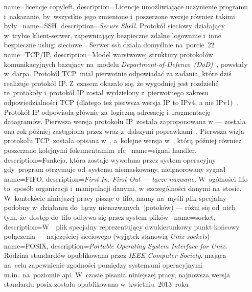 {
	name={licencje copyleft},
	description={Licencje umożliwiające uczynienie programu  i~nakazanie, by~wszystkie jego zmienione i~poszerzone wersje również takimi były~\cite{copyleft,wiki:licenses-comparison}}
}
{
	name={SSH},
	description={\emph{Secure Shell}. Protokół sieciowy działający w~trybie klient-serwer, zapewniający bezpieczne zdalne logowanie i~inne bezpieczne usługi sieciowe~\cite{rfc:ssh}. Serwer \gls{ssh} działa domyślnie na~porcie~22}
}
{
	name={TCP/IP},
	description={Model warstwowej struktury protokołów komunikacyjnych bazujący na~modelu \emph{Department-of-Defence~(DoD)}~\cite{rfc:tcpip-dod}, powstały w~\gls{darpa}. Protokół TCP~miał pierwotnie odpowiadać za zadania, które dziś realizuje protokół IP. Z~czasem okazało się, że wygodniej jest rozdzielić te~protokoły i~protokół IP został wydzielony z~pierwotnego zakresu odpowiedzialności TCP (dlatego też pierwsza wersja IP to IPv4, a nie IPv1)~\cite{tcpguide-tcpip-history}. Protokół IP odpowiada głównie za~logiczną adresację i~fragmentację datagramów. Pierwsza wersja protokołu IP~została zaproponowana w  --- została ona rok później zastąpiona przez  wraz z~dalszymi poprawkami~\cite{rfc:ip-rfc760,rfc:ip-rfc791}. Pierwsza wizja protokołu TCP~została opisana w~, a~kolejne wersja w~, którą później również poszerzano kolejnymi fokumentamim~\gls{rfc}~\cite{rfc:tcp-rfc675,rfc:ip-rfc793}}
}
{
	name={signal handler},
	description={Funkcja, która zostaje wywołana przez system operacyjny gdy~program otrzymuje od~systemu niemaskowany, nieignorowany sygnał~\cite{signal-handler}}
}
{
	name={FIFO},
	description={\emph{First In, First Out} --- \emph{łącze nazwane}. W~ogólności \gls{fifo} to~sposób organizacji i~manipulacji danymi, w~szczególności danymi na~stosie. W~kontekście niniejszej pracy pisząc o~\gls{fifo}, mamy na~myśli plik specjalny podobny w~działaniu do~łączy nienazwanych~(potoków) --- różni się od~nich tym, że~dostęp do~\gls{fifo} odbywa się przez system plików~\cite{fifo-manual}}
}
{
	name={socket},
	description={W~~plik specjalny reprezentujący dwukierunkowy punkt końcowy połączenia --- najczęściej sieciowego (wyjątek stanowią \emph{Unix sockets})~\cite{socket-definition-oracle}}
}
{
	name={POSIX},
	description={\emph{Portable Operating System Interface for Unix}. Rodzina standardów opublikowana przez \emph{IEEE Computer Society}, mająca na~celu zapewnienie zgodności pomiędzy systemami operacyjnymi m.in.~na~poziomie \acrshort{api}. W~czasie pisania niniejszej pracy, najnowsza wersja standardu \gls{posix} została opublikowana w~kwietniu~2013~roku~\cite{posix-ieee,posix-opengroup}}
}
